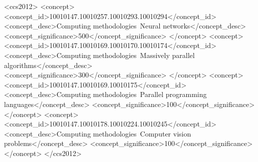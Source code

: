 \documentclass[sigconf]{acmart}
\begin{document}
%
%
\begin{CCSXML}
  <ccs2012>
    <concept>
      <concept_id>10010147.10010257.10010293.10010294</concept_id>
      <concept_desc>Computing methodologies~Neural networks</concept_desc>
      <concept_significance>500</concept_significance>
    </concept>
    <concept>
      <concept_id>10010147.10010169.10010170.10010174</concept_id>
      <concept_desc>Computing methodologies~Massively parallel algorithms</concept_desc>
      <concept_significance>300</concept_significance>
    </concept>
    <concept>
      <concept_id>10010147.10010169.10010175</concept_id>
      <concept_desc>Computing methodologies~Parallel programming languages</concept_desc>
      <concept_significance>100</concept_significance>
    </concept>
    <concept>
      <concept_id>10010147.10010178.10010224.10010245</concept_id>
      <concept_desc>Computing methodologies~Computer vision problems</concept_desc>
      <concept_significance>100</concept_significance>
    </concept>
  </ccs2012>
\end{CCSXML}


%

%

%
\maketitle
\end{document}
